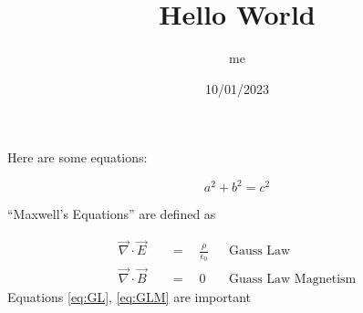 \documentclass{article}
\title{Hello World}
\author{me}
\date{10/01/2023}
\begin{document}
\maketitle

Here are some equations:

\begin{equation}
a^2 + b^2 = c^2
\end{equation}

``Maxwell's Equations'' are defined as 

\begin{align}
\vec{\nabla} \cdot \vec{E} \quad  &=\quad\frac{\rho}{\epsilon_0}  &&\text{Gauss Law} \label{eq:GL}\\
\vec{\nabla} \cdot \vec{B} \quad &=\quad0 &&\text{Guass Law Magnetism} \label{eq:GLM}
\end{align}
Equations \ref{eq:GL},  \ref{eq:GLM} are important
\end{document}
